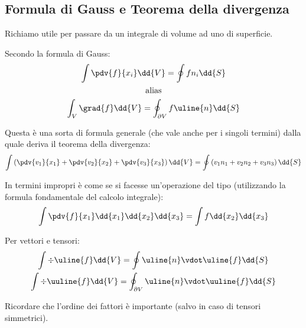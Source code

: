 \subsection*{Formula di Gauss e Teorema della divergenza}
Richiamo utile per passare da un integrale di volume ad uno di superficie.

Secondo la formula di Gauss:
	\begin{equation*}
		\begin{gathered}
			\int \pdv{f}{x_i} \dd{V} = \oint {f n_i \dd{S}}\\
			\text{alias}\\
			\int_V \grad{f} \dd{V} = \oint_{\partial V} f \uline{n} \dd{S}
		\end{gathered}
	\end{equation*}
	
Questa è una sorta di formula generale (che vale anche per i singoli termini) dalla quale deriva il teorema della divergenza:
	\begin{equation*}
		\int{ \left( \pdv{v_1}{x_1} + \pdv{v_2}{x_2} + \pdv{v_3}{x_3} \right) \dd{V}} = \oint{ \left( v_1 n_1 + v_2 n_2 + v_3 n_3 \right) \dd{S}} 
	\end{equation*}

In termini impropri è come se si facesse un'operazione del tipo (utilizzando la formula fondamentale del calcolo integrale):
	\begin{equation*}
		\int{\pdv{f}{x_1} \dd{x_1} \dd{x_2} \dd{x_3}} = \int{f \dd{x_2} \dd{x_3}}
	\end{equation*}
	
Per vettori e tensori:
	\begin{equation*}
		\begin{gathered}
			\int \div{\uline{f}} \dd{V} = \oint \uline{n} \vdot \uline{f} \dd{S}\\
			\int \div{\uuline{f}} \dd{V} = \oint_{\partial V} \uline{n} \vdot \uuline{f} \dd{S}\\
		\end{gathered}
	\end{equation*}
	
Ricordare che l'ordine dei fattori è importante (salvo in caso di tensori simmetrici).

